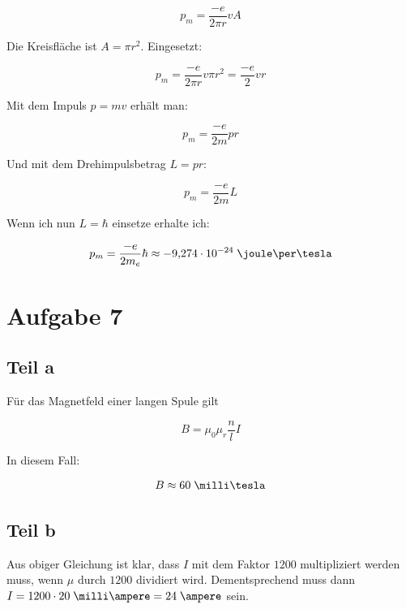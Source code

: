 \documentclass[a4paper,german,12pt,smallheadings]{scrartcl}
\begin{document}
\begin{equation}
  p_m = \frac{-e}{2 \pi r} v A
\end{equation}

Die Kreisfläche ist $A = \pi r^2$. Eingesetzt:

\begin{equation}
  p_m = \frac{-e}{2 \pi r} v \pi r^2 = \frac{-e}{2} v r
\end{equation}

Mit dem Impuls $p = mv$ erhält man:

\begin{equation}
  p_m = \frac{-e}{2m} p r
\end{equation}

Und mit dem Drehimpulsbetrag $L = pr$:

\begin{equation}
  p_m = \frac{-e}{2m} L
\end{equation}

Wenn ich nun $L = \hbar$ einsetze erhalte ich:

\begin{equation}
  p_m = \frac{-e}{2m_e} \hbar \approx -9{,}274 \cdot 10^{-24} \;\joule\per\tesla
\end{equation}

\section*{Aufgabe 7}
\subsection*{Teil a}
Für das Magnetfeld einer langen Spule gilt

\begin{equation}
  B = \mu_0 \mu_r \frac{n}{l} I
\end{equation}

In diesem Fall:

\begin{align*}
  B \approx 60 \;\milli\tesla
\end{align*}

\subsection*{Teil b}
Aus obiger Gleichung ist klar, dass $I$ mit dem Faktor $1200$ multipliziert
werden muss, wenn $\mu$ durch $1200$ dividiert wird. Dementsprechend muss dann
$I = 1200 \cdot 20\;\milli\ampere = 24\;\ampere$ sein.
\end{document}
